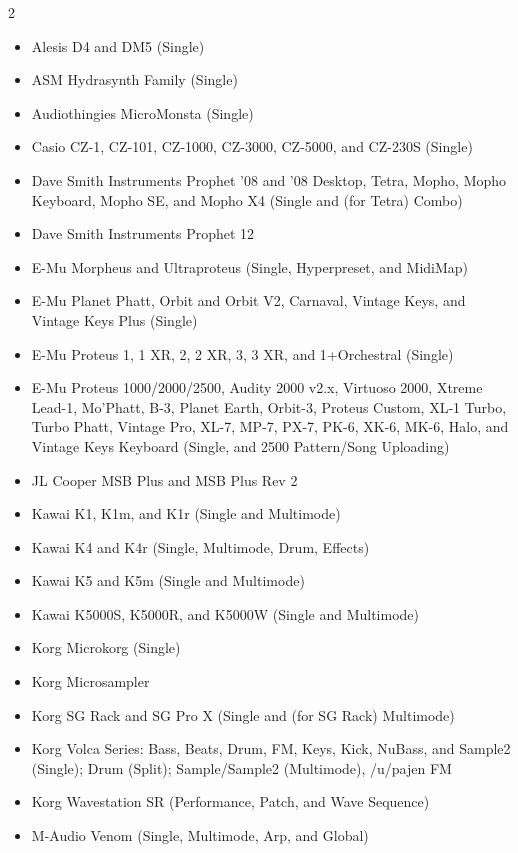 \documentclass{article}
\begin{document}
{
\footnotesize
\begin{multicols}{2}
\begin{flushleft}
\begin{itemize}
\item Alesis D4 and DM5 (Single)
\item ASM Hydrasynth Family (Single)
\item Audiothingies MicroMonsta (Single)
\item Casio CZ-1, CZ-101, CZ-1000, CZ-3000, CZ-5000, and CZ-230S (Single)
\item Dave Smith Instruments Prophet '08 and '08 Desktop, Tetra, Mopho, Mopho Keyboard, Mopho SE, and Mopho X4 (Single and (for Tetra) Combo)
\item Dave Smith Instruments Prophet 12
\item E-Mu Morpheus and Ultraproteus (Single, Hyperpreset, and MidiMap)
\item E-Mu Planet Phatt, Orbit and Orbit V2, Carnaval, Vintage Keys, and Vintage Keys Plus (Single)
\item E-Mu Proteus 1, 1 XR, 2, 2 XR, 3, 3 XR, and 1+Orchestral (Single)
\item E-Mu Proteus 1000/2000/2500, Audity 2000 v2.x, Virtuoso 2000, Xtreme Lead-1, Mo'Phatt, B-3, Planet Earth, Orbit-3, Proteus Custom, XL-1 Turbo, Turbo Phatt, Vintage Pro, XL-7, MP-7, PX-7, PK-6, XK-6, MK-6, Halo, and Vintage Keys Keyboard (Single, and 2500 Pattern/Song Uploading)
\item JL Cooper MSB Plus and MSB Plus Rev 2
\item Kawai K1, K1m, and K1r (Single and Multimode)
\item Kawai K4 and K4r (Single, Multimode, Drum, Effects)
\item Kawai K5 and K5m (Single and Multimode)
\item Kawai K5000S, K5000R, and K5000W (Single and Multimode)
\item Korg Microkorg (Single)
\item Korg Microsampler
\item Korg SG Rack and SG Pro X (Single and (for SG Rack) Multimode)
\item Korg Volca Series: Bass, Beats, Drum, FM, Keys, Kick, NuBass, and Sample2 (Single); Drum (Split); Sample/Sample2 (Multimode), /u/pajen FM
\item Korg Wavestation SR (Performance, Patch, and Wave Sequence)
\item M-Audio Venom (Single, Multimode, Arp, and Global)

\end{itemize}
\end{flushleft}
\end{multicols}}
\end{document}
